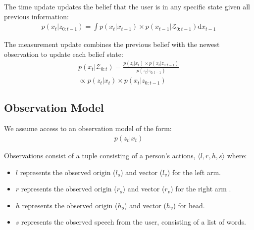 \documentclass[letterpaper, 10 pt, conference]{ieeeconf}
\begin{document}
The time update updates the belief that the user is in any specific state given all previous information:
\begin{align}
p(x_t | z_{0:t-1}) = \int p(x_t|x_{t-1})\times p(x_{t-1} | \mathcal{Z}_{0:t-1}) \text{d}x_{t-1}
\end{align}

The measurement update combines the previous belief with the newest observation to update each belief state: 
\begin{align}
p(x_t | \mathcal{Z}_{0:t}) = \frac{p(z_t | x_t) \times p(x_t | z_{0:t-1})}{p(z_t | z_{0:t-1})} \\\propto p(z_t | x_t) \times p(x_t | z_{0:t-1})
\end{align}





\subsection{Observation Model}

We assume access to an observation model of the form:
\begin{align}
p(z_t | x_t)
\end{align}

Observations consist of a tuple consisting of a person's actions,
$\langle l, r, h, s\rangle $ where:
\begin{itemize}
	\item $l$ represents the observed origin ($l_o$) and vector ($l_v$) for the left arm.
	\item $r$ represents the observed origin  ($r_o$) and vector ($r_v$)  for the right arm .
	\item $h$ represents the observed origin  ($h_o$) and vector ($h_v$)  for head.
	\item $s$ represents the observed speech from the user, consisting of a list of words.
	\end{itemize}
\end{document}
